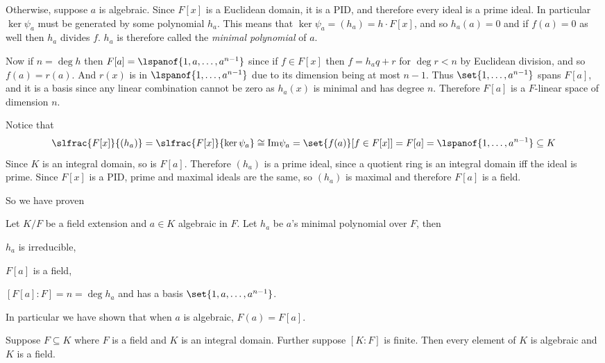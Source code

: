 \medskip
\centerline{\vbox{\tabskip=3pt}}
\medskip

Otherwise, suppose $a$ is algebraic.
Since $F[x]$ is a Euclidean domain, it is a PID, and therefore every ideal is a prime ideal.
In particular $\ker\psi_a$ must be generated by some polynomial $h_a$.
This means that $\ker\psi_a=(h_a)=h\cdot F[x]$, and so $h_a(a)=0$ and if $f(a)=0$ as well then $h_a$ divides $f$.
$h_a$ is therefore called the {\it minimal polynomial} of $a$.

Now if $n=\deg h$ then $F[a]=\lspanof{1,a,\dots,a^{n-1}}$ since if $f\in F[x]$ then $f=h_aq+r$ for $\deg r<n$ by Euclidean division, and so $f(a)=r(a)$.
And $r(x)$ is in $\lspanof{1,\dots,a^{n-1}}$ due to its dimension being at most $n-1$.
Thus $\set{1,\dots,a^{n-1}}$ spans $F[a]$, and it is a basis since any linear combination cannot be zero as $h_a(x)$ is minimal and has degree $n$.
Therefore $F[a]$ is a $F$-linear space of dimension $n$.

Notice that
$$ \slfrac{F[x]}{(h_a)} = \slfrac{F[x]}{\ker\psi_a} \cong {\rm Im}\psi_a = \set{f(a)}[{f\in F[x]}] = F[a] = \lspanof{1,\dots,a^{n-1}} \subseteq K $$
Since $K$ is an integral domain, so is $F[a]$.
Therefore $(h_a)$ is a prime ideal, since a quotient ring is an integral domain iff the ideal is prime.
Since $F[x]$ is a PID, prime and maximal ideals are the same, so $(h_a)$ is maximal and therefore $F[a]$ is a field.

So we have proven

\bprop

    Let $K/F$ be a field extension and $a\in K$ algebraic in $F$.
    Let $h_a$ be $a$'s minimal polynomial over $F$, then
    \benum
        \item $h_a$ is irreducible,
        \item $F[a]$ is a field,
        \item $[F[a]:F]=n=\deg h_a$ and has a basis $\set{1,a,\dots,a^{n-1}}$.
    \eenum

\eprop

In particular we have shown that when $a$ is algebraic, $F(a)=F[a]$.

\bprop

    Suppose $F\subseteq K$ where $F$ is a field and $K$ is an integral domain.
    Further suppose $[K:F]$ is finite.
    Then every element of $K$ is algebraic and $K$ is a field.

